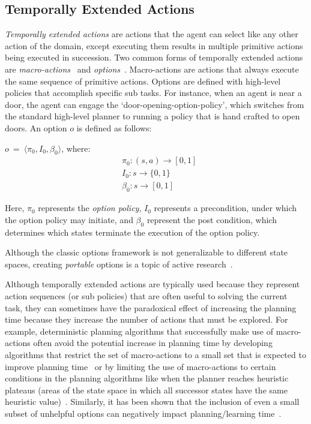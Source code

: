 \documentclass[]{article}
\newcommand{\jmnote}[1]{\textcolor{Green}{\textbf{JM: #1}}}
\begin{document}
\subsection{Temporally Extended Actions}

{\em Temporally extended actions} are actions that the agent can
select like any other action of the domain, except executing them
results in multiple primitive actions being executed in
succession. Two common forms of temporally extended actions are {\em
  macro-actions}%
  ~and {\em
  options}~\citep{sutton99}. Macro-actions are actions that always
execute the same sequence of primitive actions. Options are defined
with high-level policies that accomplish specific sub tasks. For
instance, when an agent is near a door, the agent can engage the
`door-opening-option-policy', which switches from the standard
high-level planner to running a policy that is hand crafted to open
doors. An option $o$ is defined as follows:

$o\ =\ \langle \pi_0, I_0, \beta_0\rangle$, where:
\begin{align*}
&\pi_0 : (s,a) \rightarrow [0,1] \\
&I_0 : s \rightarrow \{0,1\} \\
&\beta_0 : s \rightarrow [0,1]
\end{align*}

Here, $\pi_0$ represents the {\it option policy}, $I_0$ represents
a precondition, under which the option policy may initiate, and 
$\beta_0$ represent the post condition, which determines which 
states terminate the execution of the option policy.

Although the classic options framework is not generalizable to different state spaces,
creating {\em portable} options is a topic of active research~\citep{konidaris07,konidaris2009efficient,Ravindran03analgebraic,croonenborghs2008learning,andre2002state,konidaris2012transfer}.

Although temporally extended actions are typically used
because they represent action sequences (or sub policies) that are often useful to solving
the current task, they can sometimes have the paradoxical effect
of increasing the planning time because they increase the number of actions that must be explored.
For example, deterministic planning algorithms that successfully make use of macro-actions often avoid the potential increase
in planning time by developing algorithms that restrict the set of macro-actions to a small set that is expected to improve planning time~\citep{Botea:2005kx,Newton:2005vn} or by limiting the use of macro-actions to certain conditions
in the planning algorithms like when the planner reaches heuristic plateaus (areas of the state space in which all successor states have the same heuristic value)~\cite{Coles:2007ys}. Similarly, it has been shown that the inclusion
of even a small subset of unhelpful options can negatively impact planning/learning time~\cite{Jong:2008zr}.
\end{document}
